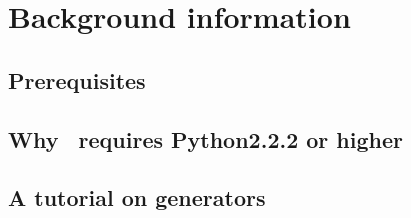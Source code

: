 \chapter{Background information}

\section{Prerequisites}

\section{Why \myhdl\ requires Python2.2.2 or higher}

\section{A tutorial on generators}



